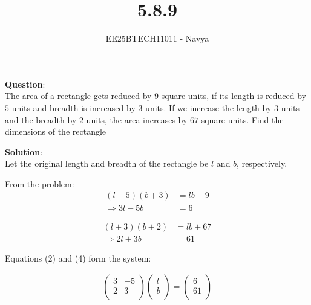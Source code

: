 \documentclass[journal]{IEEEtran}
\begin{document}

\vspace{3cm}

\title{5.8.9}
\author{EE25BTECH11011 - Navya}
{\let\newpage\relax\maketitle}

\renewcommand{\thefigure}{\theenumi}
\renewcommand{\thetable}{\theenumi}
\setlength{\intextsep}{10pt} %
\textbf{Question}:\\
The area of a rectangle gets reduced by $9$ square units, if its length is reduced by $5$ units and breadth is increased by $3$ units. If we increase the length by $3$ units and the breadth by $2$ units, the area increases by $67$ square units. Find the dimensions of the rectangle


\textbf{Solution}:\\
Let the original length and breadth of the rectangle be $l$ and $b$, respectively.

From the problem:
\begin{align}
(l - 5)(b + 3) &= lb - 9  \\
\Rightarrow 3l - 5b &= 6 
\end{align}

\begin{align}
(l + 3)(b + 2) &= lb + 67 \\
\Rightarrow 2l + 3b &= 61 
\end{align}

Equations (2) and (4) form the system:

\begin{align}
\begin{pmatrix}
3 & -5 \\
2 & 3 \\
\end{pmatrix}
\begin{pmatrix}
l \\
b \\
\end{pmatrix}
=
\begin{pmatrix}
6 \\
61 \\
\end{pmatrix}
\end{align}
\end{document}
